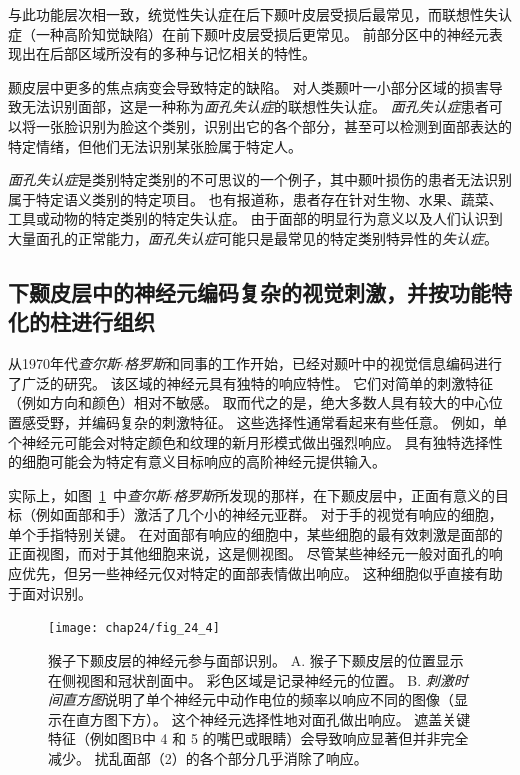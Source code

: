 与此功能层次相一致，统觉性失认症在后下颞叶皮层受损后最常见，而联想性失认症（一种高阶知觉缺陷）在前下颞叶皮层受损后更常见。
前部分区中的神经元表现出在后部区域所没有的多种与记忆相关的特性。


颞皮层中更多的焦点病变会导致特定的缺陷。
对人类颞叶一小部分区域的损害导致无法识别面部，这是一种称为\textit{面孔失认症}的联想性失认症。
\textit{面孔失认症}患者可以将一张脸识别为脸这个类别，识别出它的各个部分，甚至可以检测到面部表达的特定情绪，但他们无法识别某张脸属于特定人。


\textit{面孔失认症}是类别特定类别的不可思议的一个例子，其中颞叶损伤的患者无法识别属于特定语义类别的特定项目。
也有报道称，患者存在针对生物、水果、蔬菜、工具或动物的特定类别的特定失认症。
由于面部的明显行为意义以及人们认识到大量面孔的正常能力，\textit{面孔失认症}可能只是最常见的特定类别特异性的\textit{失认症}。



\subsection{下颞皮层中的神经元编码复杂的视觉刺激，并按功能特化的柱进行组织}

从1970年代\textit{查尔斯$\cdot$格罗斯}和同事的工作开始，已经对颞叶中的视觉信息编码进行了广泛的研究\cite{gross1999brain}。
该区域的神经元具有独特的响应特性。
它们对简单的刺激特征（例如方向和颜色）相对不敏感。 
取而代之的是，绝大多数人具有较大的中心位置感受野，并编码复杂的刺激特征。
这些选择性通常看起来有些任意。
例如，单个神经元可能会对特定颜色和纹理的新月形模式做出强烈响应。
具有独特选择性的细胞可能会为特定有意义目标响应的高阶神经元提供输入。


实际上，如图~\ref{fig:24_4}~中\textit{查尔斯$\cdot$格罗斯}所发现的那样，在下颞皮层中，正面有意义的目标（例如面部和手）激活了几个小的神经元亚群\cite{gross1969visual}。
对于手的视觉有响应的细胞，单个手指特别关键。
在对面部有响应的细胞中，某些细胞的最有效刺激是面部的正面视图，而对于其他细胞来说，这是侧视图。
尽管某些神经元一般对面孔的响应优先，但另一些神经元仅对特定的面部表情做出响应。
这种细胞似乎直接有助于面对识别。


\begin{figure}[htbp]
	\centering
	\texttt{[image: chap24/fig\_24\_4]}
	\caption{猴子下颞皮层的神经元参与面部识别。
		A. 猴子下颞皮层的位置显示在侧视图和冠状剖面中。
		彩色区域是记录神经元的位置。 
		B. \textit{刺激时间直方图}说明了单个神经元中动作电位的频率以响应不同的图像（显示在直方图下方）。
		这个神经元选择性地对面孔做出响应。
		遮盖关键特征（例如图B中  4 和 5 的嘴巴或眼睛）会导致响应显著但并非完全减少。
		扰乱面部（2）的各个部分几乎消除了响应。}
	\label{fig:24_4}
\end{figure}


